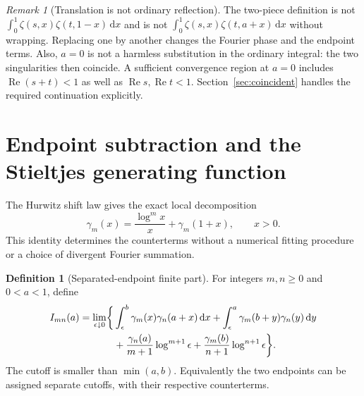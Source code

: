 \documentclass[11pt]{article}
\numberwithin{equation}{section}
\theoremstyle{definition}
\newtheorem{definition}[theorem]{Definition}
\theoremstyle{remark}
\newtheorem{remark}[theorem]{Remark}
\DeclareMathOperator{\Rea}{Re}
\newcommand{\dd}{\,\mathrm d}
\begin{document}
\begin{remark}[Translation is not ordinary reflection]
The two-piece definition is not
$\int_0^1\zeta(s,x)\zeta(t,1-x)\dd x$ and is not
$\int_0^1\zeta(s,x)\zeta(t,a+x)\dd x$ without wrapping.
Replacing one by another changes the Fourier phase and the endpoint
terms. Also, $a=0$ is not a harmless substitution in the ordinary integral:
the two singularities then coincide. A sufficient convergence region at
$a=0$ includes $\Rea(s+t)<1$ as well as $\Rea s,\Rea t<1$.
Section~\ref{sec:coincident} handles the required continuation explicitly.
\end{remark}

\section{Endpoint subtraction and the Stieltjes generating function}
\label{sec:finitepart}

The Hurwitz shift law gives the exact local decomposition
\begin{equation}
 \gamma_m(x)=\frac{\log^m x}{x}+\gamma_m(1+x),
 \qquad x>0.
 \label{eq:stieltjes-shift}
\end{equation}
This identity determines the counterterms without a numerical fitting
procedure or a choice of divergent Fourier summation.

\begin{definition}[Separated-endpoint finite part]
\label{def:finitepart}
For integers $m,n\ge0$ and $0<a<1$, define
\begin{align}
 I_{mn}(a)=\lim_{\epsilon\downarrow0}\biggl\{
 &\int_\epsilon^b\gamma_m(x)\gamma_n(a+x)\dd x
 +\int_\epsilon^a\gamma_m(b+y)\gamma_n(y)\dd y\notag\\
 &+\frac{\gamma_n(a)}{m+1}\log^{m+1}\epsilon
 +\frac{\gamma_m(b)}{n+1}\log^{n+1}\epsilon\biggr\}.
 \label{eq:I-cutoff}
\end{align}
The cutoff is smaller than $\min(a,b)$. Equivalently the two endpoints
can be assigned separate cutoffs, with their respective counterterms.
\end{definition}
\end{document}
